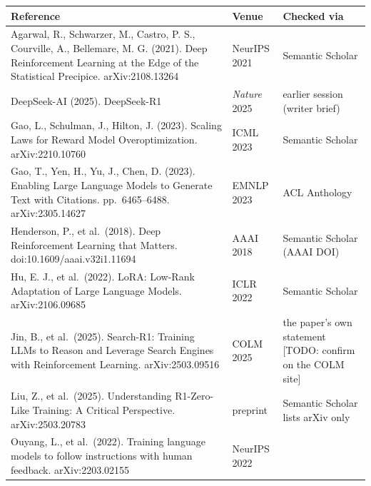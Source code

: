 {\def\LTcaptype{none} %
\begin{longtable}[]{@{}
  >{\raggedright\arraybackslash}p{}
  >{\raggedright\arraybackslash}p{}
  >{\raggedright\arraybackslash}p{}@{}}
\toprule\noalign{}
\begin{minipage}[b]{\linewidth}\raggedright
Reference
\end{minipage} & \begin{minipage}[b]{\linewidth}\raggedright
Venue
\end{minipage} & \begin{minipage}[b]{\linewidth}\raggedright
Checked via
\end{minipage} \\
\midrule\noalign{}
\endhead
\bottomrule\noalign{}
\endlastfoot
Agarwal, R., Schwarzer, M., Castro, P. S., Courville, A., Bellemare, M.
G. (2021). Deep Reinforcement Learning at the Edge of the Statistical
Precipice. arXiv:2108.13264 & NeurIPS 2021 & Semantic Scholar \\
DeepSeek-AI (2025). DeepSeek-R1 & \emph{Nature} 2025 & earlier session
(writer brief) \\
Gao, L., Schulman, J., Hilton, J. (2023). Scaling Laws for Reward Model
Overoptimization. arXiv:2210.10760 & ICML 2023 & Semantic Scholar \\
Gao, T., Yen, H., Yu, J., Chen, D. (2023). Enabling Large Language
Models to Generate Text with Citations. pp.~6465--6488. arXiv:2305.14627
& EMNLP 2023 & ACL Anthology \\
Henderson, P., et al.~(2018). Deep Reinforcement Learning that Matters.
doi:10.1609/aaai.v32i1.11694 & AAAI 2018 & Semantic Scholar (AAAI
DOI) \\
Hu, E. J., et al.~(2022). LoRA: Low-Rank Adaptation of Large Language
Models. arXiv:2106.09685 & ICLR 2022 & Semantic Scholar \\
Jin, B., et al.~(2025). Search-R1: Training LLMs to Reason and Leverage
Search Engines with Reinforcement Learning. arXiv:2503.09516 & COLM 2025
& the paper's own statement {[}TODO: confirm on the COLM site{]} \\
Liu, Z., et al.~(2025). Understanding R1-Zero-Like Training: A Critical
Perspective. arXiv:2503.20783 & preprint & Semantic Scholar lists arXiv
only \\
Ouyang, L., et al.~(2022). Training language models to follow
instructions with human feedback. arXiv:2203.02155 & NeurIPS 2022 &

\end{longtable}}
